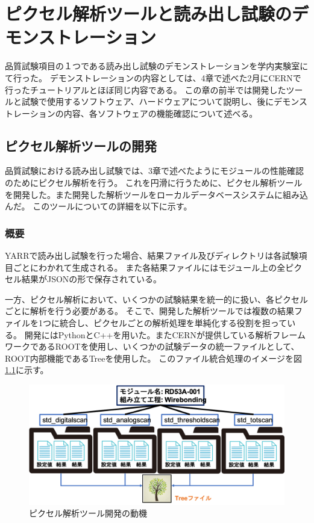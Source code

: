 \chapter{ピクセル解析ツールと読み出し試験のデモンストレーション}
品質試験項目の１つである読み出し試験のデモンストレーションを学内実験室にて行った。
デモンストレーションの内容としては、4章で述べた2月にCERNで行ったチュートリアルとほぼ同じ内容である。
この章の前半では開発したツールと試験で使用するソフトウェア、ハードウェアについて説明し、後にデモンストレーションの内容、各ソフトウェアの機能確認について述べる。

\section{ピクセル解析ツールの開発}
品質試験における読み出し試験では、3章で述べたようにモジュールの性能確認のためにピクセル解析を行う。
これを円滑に行うために、ピクセル解析ツールを開発した。また開発した解析ツールをローカルデータベースシステムに組み込んだ。
このツールについての詳細を以下に示す。

\subsection{概要}
YARRで読み出し試験を行った場合、結果ファイル及びディレクトリは各試験項目ごとにわかれて生成される。
また各結果ファイルにはモジュール上の全ピクセル結果がJSONの形で保存されている。

一方、ピクセル解析において、いくつかの試験結果を統一的に扱い、各ピクセルごとに解析を行う必要がある。
そこで、開発した解析ツールでは複数の結果ファイルを1つに統合し、ピクセルごとの解析処理を単純化する役割を担っている。
開発にはPythonとC++を用いた。またCERNが提供している解析フレームワークであるROOT\cite{5-5}を使用し、いくつかの試験データの統一ファイルとして、ROOT内部機能であるTreeを使用した。
このファイル統合処理のイメージを図\ref{analysis_tool_motivation}に示す。

\begin{figure}[bpt]\centering
\includegraphics[width=12cm]{analysis_tool_motivation}
\caption[ピクセル解析ツール開発の動機]{ピクセル解析ツール開発の動機}
\label{analysis_tool_motivation}
\end{figure}

